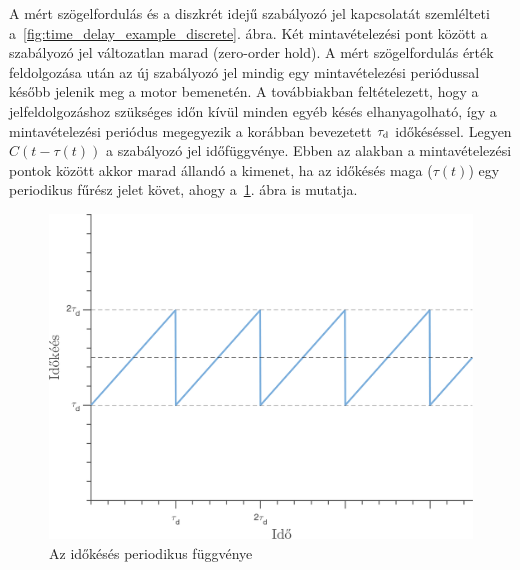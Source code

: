 A mért szögelfordulás és a diszkrét idejű szabályozó jel kapcsolatát szemlélteti a~\ref{fig:time_delay_example_discrete}. ábra.
Két mintavételezési pont között a szabályozó jel változatlan marad (zero-order hold). A mért szögelfordulás érték 
feldolgozása után az új szabályozó jel mindig egy mintavételezési periódussal később jelenik meg a motor bemenetén.
A továbbiakban feltételezett, hogy a jelfeldolgozáshoz szükséges időn kívül minden egyéb késés elhanyagolható, 
így a mintavételezési periódus megegyezik a korábban bevezetett \(\tau_{\mathrm{d}}\) időkéséssel. Legyen \(C(t-\tau(t))\) 
a szabályozó jel időfüggvénye. Ebben az alakban a mintavételezési pontok között akkor marad állandó a kimenet, ha 
az időkésés maga (\(\tau(t)\)) egy periodikus fűrész jelet követ, ahogy a~\ref{fig:time_delay_example_zoh}. ábra is mutatja.
\begin{figure}[H]
    \begin{center}
    \includegraphics[width=12cm]{images/delay_zoh_example_discrete.png}
    \caption{Az időkésés periodikus függvénye}\label{fig:time_delay_example_zoh}
    \end{center}
\end{figure}

